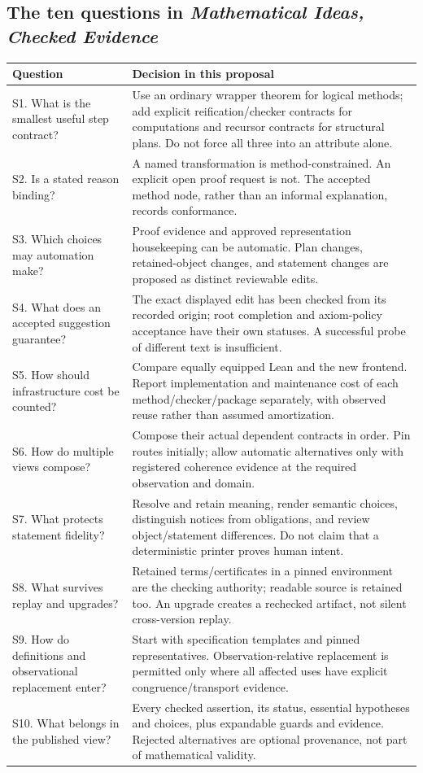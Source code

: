 \documentclass[11pt,a4paper]{article}
\theoremstyle{remark}\newtheorem{example}[proposition]{Example}
\begin{document}
\subsection{The ten questions in \emph{Mathematical Ideas, Checked Evidence}}
\begingroup\small
\begin{longtable}{@{}P{.34\textwidth}P{.58\textwidth}@{}}
\toprule
Question & Decision in this proposal \\
\midrule\endhead
S1. What is the smallest useful step contract? & Use an ordinary wrapper theorem for logical methods; add explicit reification/checker contracts for computations and recursor contracts for structural plans. Do not force all three into an attribute alone.\\
S2. Is a stated reason binding? & A named transformation is method-constrained. An explicit open proof request is not. The accepted method node, rather than an informal explanation, records conformance.\\
S3. Which choices may automation make? & Proof evidence and approved representation housekeeping can be automatic. Plan changes, retained-object changes, and statement changes are proposed as distinct reviewable edits.\\
S4. What does an accepted suggestion guarantee? & The exact displayed edit has been checked from its recorded origin; root completion and axiom-policy acceptance have their own statuses. A successful probe of different text is insufficient.\\
S5. How should infrastructure cost be counted? & Compare equally equipped Lean and the new frontend. Report implementation and maintenance cost of each method/checker/package separately, with observed reuse rather than assumed amortization.\\
S6. How do multiple views compose? & Compose their actual dependent contracts in order. Pin routes initially; allow automatic alternatives only with registered coherence evidence at the required observation and domain.\\
S7. What protects statement fidelity? & Resolve and retain meaning, render semantic choices, distinguish notices from obligations, and review object/statement differences. Do not claim that a deterministic printer proves human intent.\\
S8. What survives replay and upgrades? & Retained terms/certificates in a pinned environment are the checking authority; readable source is retained too. An upgrade creates a rechecked artifact, not silent cross-version replay.\\
S9. How do definitions and observational replacement enter? & Start with specification templates and pinned representatives. Observation-relative replacement is permitted only where all affected uses have explicit congruence/transport evidence.\\
S10. What belongs in the published view? & Every checked assertion, its status, essential hypotheses and choices, plus expandable guards and evidence. Rejected alternatives are optional provenance, not part of mathematical validity.\\
\bottomrule
\end{longtable}
\endgroup
\end{document}
